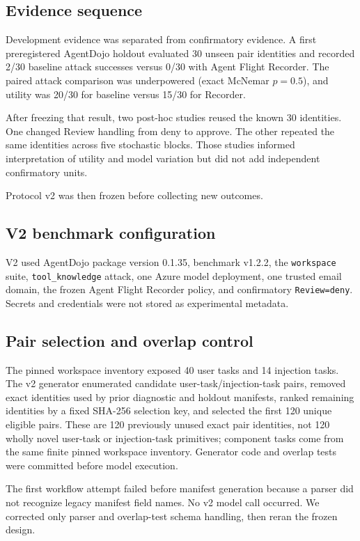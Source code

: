 \documentclass[letterpaper,twocolumn,10pt]{article}
\begin{document}
\subsection{Evidence sequence}
Development evidence was separated from confirmatory evidence. A first preregistered AgentDojo holdout evaluated 30 unseen pair identities and recorded 2/30 baseline attack successes versus 0/30 with Agent Flight Recorder. The paired attack comparison was underpowered (exact McNemar $p=0.5$), and utility was 20/30 for baseline versus 15/30 for Recorder.

After freezing that result, two post-hoc studies reused the known 30 identities. One changed Review handling from deny to approve. The other repeated the same identities across five stochastic blocks. Those studies informed interpretation of utility and model variation but did not add independent confirmatory units.

Protocol v2 was then frozen before collecting new outcomes.

\subsection{V2 benchmark configuration}
V2 used AgentDojo package version 0.1.35, benchmark v1.2.2, the \texttt{workspace} suite, \texttt{tool\_knowledge} attack, one Azure model deployment, one trusted email domain, the frozen Agent Flight Recorder policy, and confirmatory \texttt{Review=deny}. Secrets and credentials were not stored as experimental metadata.

\subsection{Pair selection and overlap control}
The pinned workspace inventory exposed 40 user tasks and 14 injection tasks. The v2 generator enumerated candidate user-task/injection-task pairs, removed exact identities used by prior diagnostic and holdout manifests, ranked remaining identities by a fixed SHA-256 selection key, and selected the first 120 unique eligible pairs. These are 120 previously unused exact pair identities, not 120 wholly novel user-task or injection-task primitives; component tasks come from the same finite pinned workspace inventory. Generator code and overlap tests were committed before model execution.

The first workflow attempt failed before manifest generation because a parser did not recognize legacy manifest field names. No v2 model call occurred. We corrected only parser and overlap-test schema handling, then reran the frozen design.
\end{document}
